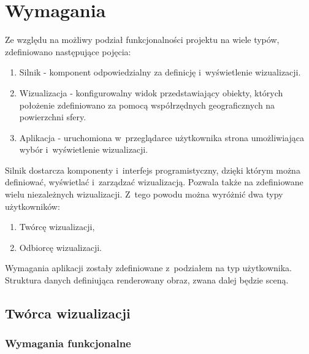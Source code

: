 
\newcommand{\req}[3]{
    \stepcounter{#2}
    #1\_\arabic{#2} & #3 \\
    \hline
}

\chapter{Wymagania}
\label{chap:Requirements}

Ze względu na możliwy podział funkcjonalności projektu na wiele typów, zdefiniowano następujące pojęcia:
\begin{enumerate}
    \item Silnik - komponent odpowiedzialny za definicję i~wyświetlenie wizualizacji.
    \item Wizualizacja - konfigurowalny widok przedstawiający obiekty, których położenie zdefiniowano za pomocą współrzędnych geograficznych na powierzchni sfery.
    \item Aplikacja - uruchomiona w~przeglądarce użytkownika strona umożliwiająca wybór i~wyświetlenie wizualizacji.
\end{enumerate} 

Silnik dostarcza komponenty i~interfejs programistyczny, dzięki którym można definiować, wyświetlać i~zarządzać wizualizacją.
Pozwala także na zdefiniowane wielu niezależnych wizualizacji. Z~tego powodu można wyróżnić dwa typy użytkowników:

\begin{enumerate}
    \item Twórcę wizualizacji,
    \item Odbiorcę wizualizacji.
\end{enumerate}

Wymagania aplikacji zostały zdefiniowane z~podziałem na typ użytkownika.
Struktura danych definiująca renderowany obraz, zwana dalej będzie sceną.
\clearpage
\section{Twórca wizualizacji}

\subsection{Wymagania funkcjonalne}


